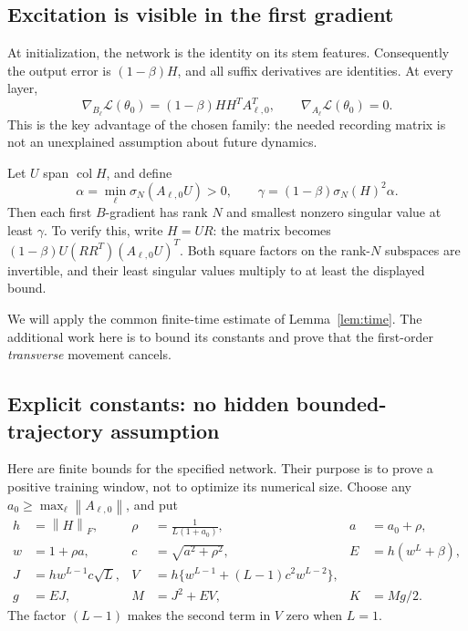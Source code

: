 \documentclass[12pt,a4paper]{article}
\theoremstyle{readable}
\theoremstyle{definition}\newtheorem{example}[theorem]{Example}
\newcommand{\col}{\operatorname{col}}\newcommand{\row}{\operatorname{row}}
\newcommand{\norm}[1]{\left\|#1\right\|}
\begin{document}
\subsection{Excitation is visible in the first gradient}
At initialization, the network is the identity on its stem features. Consequently the output error is \((1-\beta)H\), and all suffix derivatives are identities. At every layer,
\begin{equation}\label{eq:initialgradient}
\nabla_{B_\ell}\mathcal L(\theta_0)
=(1-\beta)HH^TA_{\ell,0}^T,
\qquad \nabla_{A_\ell}\mathcal L(\theta_0)=0.
\end{equation}
This is the key advantage of the chosen family: the needed recording matrix is not an unexplained assumption about future dynamics.

Let \(U\) span \(\col H\), and define
\[
\alpha=\min_\ell\sigma_N(A_{\ell,0}U)>0,
\qquad
\gamma=(1-\beta)\sigma_N(H)^2\alpha.
\]
Then each first \(B\)-gradient has rank \(N\) and smallest nonzero singular value at least \(\gamma\). To verify this, write \(H=UR\): the matrix becomes
\((1-\beta)U(RR^T)(A_{\ell,0}U)^T\). Both square factors on the rank-\(N\) subspaces are invertible, and their least singular values multiply to at least the displayed bound.

We will apply the common finite-time estimate of Lemma~\ref{lem:time}. The additional work here is to bound its constants and prove that the first-order \emph{transverse} movement cancels.

\subsection{Explicit constants: no hidden bounded-trajectory assumption}
Here are finite bounds for the specified network. Their purpose is to prove a positive training window, not to optimize its numerical size. Choose any
\(a_0\ge\max_\ell\norm{A_{\ell,0}}\), and put
\begin{align*}
h&=\norm H_F,& \rho&=\frac1{L(1+a_0)},& a&=a_0+\rho,\\
w&=1+\rho a,& c&=\sqrt{a^2+\rho^2},& E&=h(w^L+\beta),\\
J&=h w^{L-1}c\sqrt L,&
V&=h\{w^{L-1}+(L-1)c^2w^{L-2}\},\\
g&=EJ,& M&=J^2+EV,& K&=Mg/2.
\end{align*}
The factor \((L-1)\) makes the second term in \(V\) zero when \(L=1\).
\end{document}
